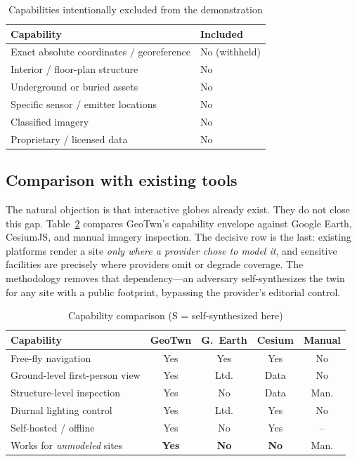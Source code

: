 \documentclass[conference]{IEEEtran}
\begin{document}
\begin{table}[t]
\caption{Capabilities intentionally excluded from the demonstration}
\label{tab:notdemo}
\centering
\begin{tabular}{@{}ll@{}}
\toprule
\textbf{Capability} & \textbf{Included} \\
\midrule
Exact absolute coordinates / georeference & No (withheld) \\
Interior / floor-plan structure           & No \\
Underground or buried assets              & No \\
Specific sensor / emitter locations       & No \\
Classified imagery                        & No \\
Proprietary / licensed data               & No \\
\bottomrule
\end{tabular}
\end{table}

\subsection{Comparison with existing tools}
The natural objection is that interactive globes already exist. They do not close
this gap. Table~\ref{tab:compare} compares GeoTwn's capability envelope against
Google Earth, CesiumJS, and manual imagery inspection. The decisive row is the
last: existing platforms render a site \emph{only where a provider chose to model
it}, and sensitive facilities are precisely where providers omit or degrade
coverage. The methodology removes that dependency---an adversary self-synthesizes
the twin for any site with a public footprint, bypassing the provider's editorial
control.

\begin{table}[t]
\caption{Capability comparison (S = self-synthesized here)}
\label{tab:compare}
\centering
\setlength{\tabcolsep}{4pt}
\begin{tabular}{@{}lcccc@{}}
\toprule
\textbf{Capability} & \textbf{GeoTwn} & \textbf{G.\ Earth} & \textbf{Cesium} & \textbf{Manual} \\
\midrule
Free-fly navigation            & Yes & Yes  & Yes  & No  \\
Ground-level first-person view & Yes & Ltd. & Data & No  \\
Structure-level inspection     & Yes & No   & Data & Man.\\
Diurnal lighting control       & Yes & Ltd. & Yes  & No  \\
Self-hosted / offline          & Yes & No   & Yes  & --  \\
Works for \emph{unmodeled} sites & \textbf{Yes} & \textbf{No} & \textbf{No} & Man. \\
\bottomrule
\end{tabular}
\end{table}
\end{document}
